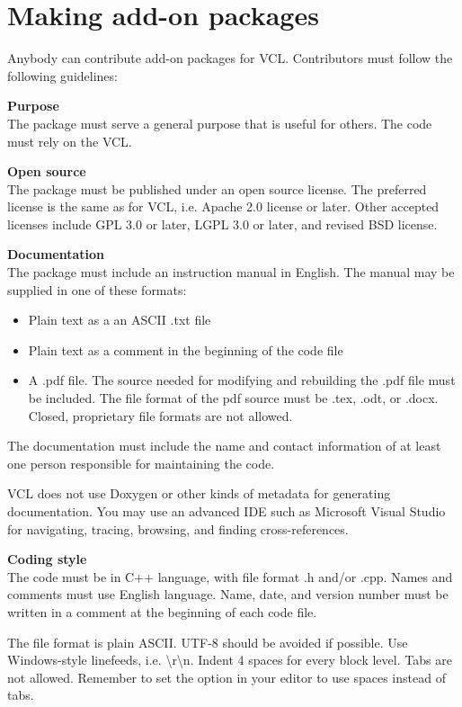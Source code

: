 \documentclass[vcl_manual.tex]{subfiles}
\begin{document}
\section{Making add-on packages}\label{MakingPackages}
\flushleft

Anybody can contribute add-on packages for VCL. Contributors must follow the following guidelines:


\textbf{Purpose}\\
The package must serve a general purpose that is useful for others. The code must rely on the VCL.

\textbf{Open source}\\
The package must be published under an open source license. 
The preferred license is the same as for VCL, i.e. Apache 2.0 license or later.
Other accepted licenses include GPL 3.0 or later, LGPL 3.0 or later, and revised BSD license.

\textbf{Documentation}\\
The package must include an instruction manual in English. The manual may be supplied in one of these formats:
\begin{itemize}
  \item Plain text as a an ASCII .txt file
  \item Plain text as a comment in the beginning of the code file
  \item A .pdf file. The source needed for modifying and rebuilding the .pdf file must be included.
        The file format of the pdf source must be .tex, .odt, or .docx. Closed, proprietary file formats are not allowed.
\end{itemize}
The documentation must include the name and contact information of at least one person responsible for maintaining the code.

VCL does not use Doxygen or other kinds of metadata for generating documentation. You may use an advanced IDE such as Microsoft Visual Studio for navigating, tracing, browsing, and finding cross-references.


\textbf{Coding style}\label{CodingStyle} \\
The code must be in C++ language, with file format .h and/or .cpp.
Names and comments must use English language.
Name, date, and version number must be written in a comment at the beginning of each code file.

The file format is plain ASCII. UTF-8 should be avoided if possible. 
Use Windows-style linefeeds, i.e. \textbackslash r\textbackslash n.
Indent 4 spaces for every block level. Tabs are not allowed. Remember to set the option in your editor to use spaces instead of tabs.
\end{document}
